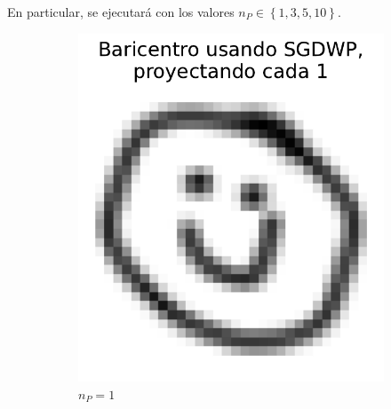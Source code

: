 En particular, se ejecutará con los valores $n_P \in \left\{ 1, 3, 5, 10 \right\}$.

\begin{figure}[htbp]
    \centering
    \begin{subfigure}[b]{0.23\textwidth}
        \centering
        \includegraphics[width=\textwidth]{img/sgdwp-pe/bar-SGDWP-pe-01.pdf}
        \caption{$n_P=1$}
        \label{fig:bar-SGDWP-pe-01}
    \end{subfigure}
    \hfill
    \begin{subfigure}[b]{0.23\textwidth}
        \centering

\end{subfigure}
\end{figure}
